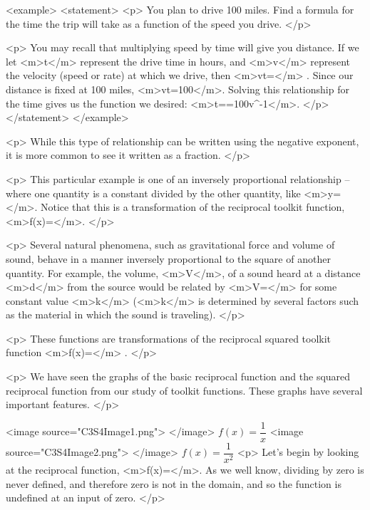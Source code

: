         <example>
            <statement>
                <p>
                    You plan to drive 100 miles.
                    Find a formula for the time the trip will take as a function of the speed you drive.
                </p>

                <p>
                    You may recall that multiplying speed by time will give you distance.
                    If we let <m>t</m> represent the drive time in hours, and <m>v</m> represent the velocity (speed or rate) at which we drive, then <m>vt=</m> .
                    Since our distance is fixed at 100 miles, <m>vt=100</m>.
                    Solving this relationship for the time gives us the function we desired: <m>t==100v^{-1}</m>.
                </p>
            </statement>
        </example>

        <p>
            While this type of relationship can be written using the negative exponent, it is more common to see it written as a fraction.
        </p>

        <p>
            This particular example is one of an inversely proportional relationship – where one quantity is a constant divided by the other quantity, like <m>y=</m>.
            Notice that this is a transformation of the reciprocal toolkit function, <m>f(x)=</m>.
        </p>

        <p>
            Several natural phenomena, such as gravitational force and volume of sound, behave in a manner inversely proportional to the square of another quantity.
            For example, the volume, <m>V</m>, of a sound heard at a distance <m>d</m> from the source would be related by <m>V=</m> for some constant value <m>k</m> (<m>k</m> is determined by several factors such as the material in which the sound is traveling).
        </p>

        <p>
            These functions are transformations of the reciprocal squared toolkit function <m>f(x)=</m> .
        </p>

        <p>
            We have seen the graphs of the basic reciprocal function and the squared reciprocal function from our study of toolkit functions.
            These graphs have several important features.
        </p>

        <image source="C3S4Image1.png">
        </image>
        $f(x)=\dfrac{1}{x}$
        <image source="C3S4Image2.png">
        </image>
        $f(x)=\dfrac{1}{x^2}$
        <p>
            Let’s begin by looking at the reciprocal function, <m>f(x)=</m>.
            As we well know, dividing by zero is never defined, and therefore zero is not in the domain, and so the function is undefined at an input of zero.
        </p>


